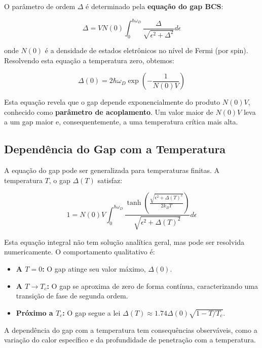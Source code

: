 \documentclass[12pt, a4paper, oneside]{report}
\begin{document}
O parâmetro de ordem $\Delta$ é determinado pela \textbf{equação do gap BCS}:

\begin{equation}
    \Delta = V N(0) \int_0^{\hbar \omega_D} \frac{\Delta}{\sqrt{\epsilon^2 + \Delta^2}} d\epsilon
\end{equation}

onde $N(0)$ é a densidade de estados eletrônicos no nível de Fermi (por spin). Resolvendo esta equação a temperatura zero, obtemos:

\begin{equation}
    \Delta(0) = 2 \hbar \omega_D \exp\left(-\frac{1}{N(0)V}\right)
\end{equation}

Esta equação revela que o gap depende exponencialmente do produto $N(0)V$, conhecido como \textbf{parâmetro de acoplamento}. Um valor maior de $N(0)V$ leva a um gap maior e, consequentemente, a uma temperatura crítica mais alta.

\subsection{Dependência do Gap com a Temperatura}

A equação do gap pode ser generalizada para temperaturas finitas. A temperatura $T$, o gap $\Delta(T)$ satisfaz:

\begin{equation}
    1 = N(0)V \int_0^{\hbar \omega_D} \frac{\tanh\left(\frac{\sqrt{\epsilon^2 + \Delta(T)^2}}{2k_B T}\right)}{\sqrt{\epsilon^2 + \Delta(T)^2}} d\epsilon
\end{equation}

Esta equação integral não tem solução analítica geral, mas pode ser resolvida numericamente. O comportamento qualitativo é:

\begin{itemize}
    \item \textbf{A $T = 0$:} O gap atinge seu valor máximo, $\Delta(0)$.
    \item \textbf{A $T \to T_c$:} O gap se aproxima de zero de forma contínua, caracterizando uma transição de fase de segunda ordem.
    \item \textbf{Próximo a $T_c$:} O gap segue a lei $\Delta(T) \approx 1.74 \Delta(0) \sqrt{1 - T/T_c}$.
\end{itemize}

A dependência do gap com a temperatura tem consequências observáveis, como a variação do calor específico e da profundidade de penetração com a temperatura.
\end{document}
